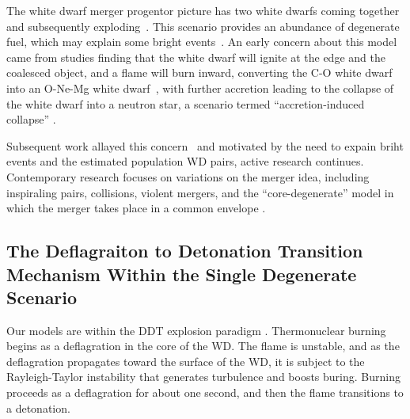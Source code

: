 \documentclass[iop,apj]{emulateapj}
\begin{document}
The white dwarf merger progentor picture has two white dwarfs coming 
together and subsequently exploding~\citep{tutukovyungelson76,tutukovyungelson79,
webbink84,ibentutukov84}. This scenario provides an abundance of degenerate fuel, 
which may explain some bright events~\citep{scalzo:2010,Yuan:2010}. 
An early concern about this model came from studies finding that
the white dwarf will ignite at the edge and the coalesced object, 
and a flame will burn inward, converting the C-O white dwarf into 
an O-Ne-Mg white dwarf~\citep{saionomoto1985,saionomoto2004}, with
further accretion leading to the collapse of the white dwarf
into a neutron star, a scenario termed ``accretion-induced collapse''
\citep{nomotokondo1991}.

Subsequent work allayed this concern~\citep{yoonetal2007,lorenaguilaretal2009,
Shenetal12, pakmoretal2012b} and motivated by the need to expain briht events
and the estimated population WD pairs, active research continues. Contemporary
research focuses on variations on the merger idea, including 
inspiraling pairs, collisions, violent mergers,
and the ``core-degenerate'' model in which the merger takes place in
a common envelope \citep{raskinetal2009,pakmoretal2011,kashi:2011,pakmoretal2012a,Shenetal12,katzetal2016}.


\subsection{The Deflagraiton to Detonation Transition Mechanism Within the Single Degenerate Scenario}

Our models are within the DDT explosion paradigm \cite{1986SvAL,
Khokhlov1991Delayed-detonat,NiemWoos97,Niem99,belletal2004,fishjump2015}. 
Thermonuclear burning begins as a deflagration in the core of the WD.
The flame is unstable, and as the deflagration propagates toward the surface
of the WD, it is subject to the Rayleigh-Taylor instability that generates
turbulence and boosts buring.  
Burning proceeds as a deflagration for about one second, and then 
the flame transitions to a detonation. 


\end{document}
